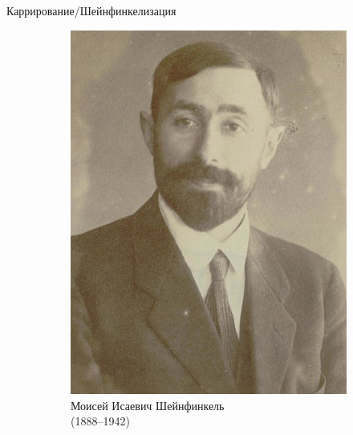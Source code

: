\begin{frame}{Каррирование/Шейнфинкелизация}
\begin{figure}[t]
\begin{subfigure}[t]{0.4 \textwidth}
  \end{subfigure}
\hspace{1cm}
  \begin{subfigure}[t]{0.25\textwidth}
      \begin{minipage}{1\textwidth}
      \includegraphics[width=1\textwidth]{440px-Moses_Schonfinkel_1922_(cropped).jpg}\\
      \centering      Моисей Исаевич Шейнфинкель \\(1888--1942)
    \end{minipage}
  \end{subfigure}
  \begin{subfigure}[t]{.25\textwidth}
    \begin{minipage}{1\textwidth}
      \vspace{-1mm}

\end{minipage}
\end{subfigure}
\end{figure}
\end{frame}

